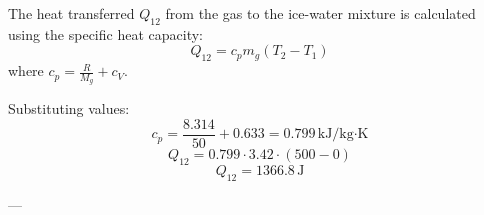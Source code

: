 The heat transferred \( Q_{12} \) from the gas to the ice-water mixture is calculated using the specific heat capacity:  
\[
Q_{12} = c_p m_g (T_{2} - T_{1})
\]  
where \( c_p = \frac{R}{M_g} + c_V \).  

Substituting values:  
\[
c_p = \frac{8.314}{50} + 0.633 = 0.799 \, \text{kJ/kg·K}
\]  
\[
Q_{12} = 0.799 \cdot 3.42 \cdot (500 - 0)
\]  
\[
Q_{12} = 1366.8 \, \text{J}
\]  

---